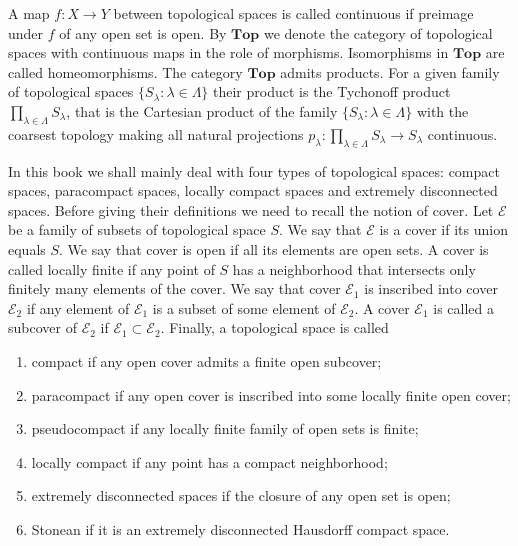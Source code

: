 A map $f:X\to Y$ between topological spaces is called continuous if preimage
under $f$ of any open set is open. By $\mathbf{Top}$ we denote the category of
topological spaces with continuous maps in the role of morphisms. Isomorphisms
in $\mathbf{Top}$ are called homeomorphisms. The category $\mathbf{Top}$ admits
products. For a given family of topological spaces $
\{S_\lambda:\lambda\in\Lambda \}$ their product is the Tychonoff product
$\prod_{\lambda\in\Lambda}S_\lambda$, that is the Cartesian product of the
family $ \{S_\lambda:\lambda\in\Lambda \}$ with the coarsest topology making all
natural projections $p_\lambda:\prod_{\lambda\in\Lambda}S_\lambda\to S_\lambda$
continuous.

In this book we shall mainly deal with four types of topological spaces: compact
spaces, paracompact spaces, locally compact spaces and extremely disconnected
spaces. Before giving their definitions we need to recall the notion of cover.
Let $\mathcal{E}$ be a family of subsets of topological space $S$. We say that
$\mathcal{E}$ is a cover if its union equals $S$. We say that cover is open if
all its elements are open sets. A cover is called locally finite if any point of
$S$ has a neighborhood that intersects only finitely many elements of the cover.
We say that cover $\mathcal{E}_1$ is inscribed into cover $\mathcal{E}_2$ if any
element of $\mathcal{E}_1$ is a subset of some element of $\mathcal{E}_2$. A
cover $\mathcal{E}_1$ is called a subcover of $\mathcal{E}_2$ if
$\mathcal{E}_1\subset\mathcal{E}_2$. Finally, a topological space is called 
\begin{enumerate}[label = (\roman*)]
  \item compact if any open cover admits a finite open subcover; 

  \item paracompact if any open cover is inscribed into some locally finite
  open cover;
  
  \item pseudocompact if any locally finite family of open sets is finite;

  \item locally compact if any point has a compact neighborhood;

  \item extremely disconnected spaces if the closure of any open set is
  open;

  \item Stonean if it is an extremely disconnected Hausdorff compact space.
\end{enumerate}

